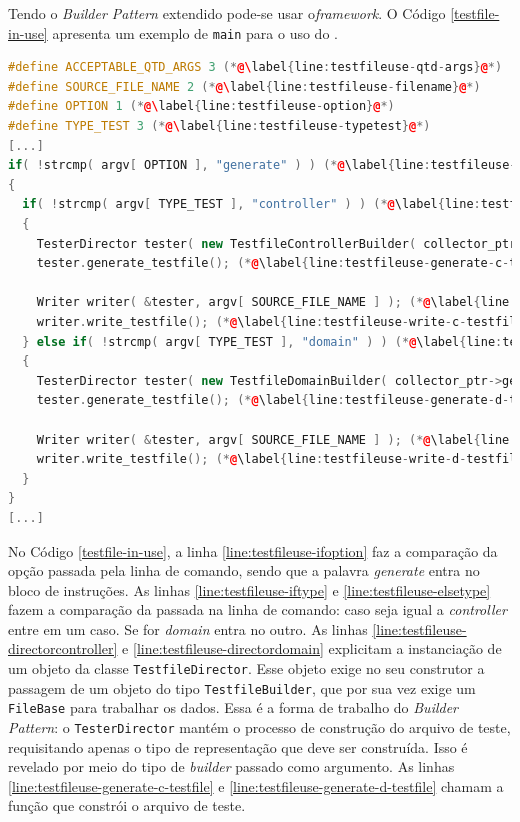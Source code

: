 Tendo o \textit{Builder Pattern} extendido pode-se usar o\textit{framework}.
O Código \ref{testfile-in-use} apresenta um exemplo de \lstinline|main| para
o uso do \Scarefault.

\begin{lstlisting}[language=C++, label=testfile-in-use, caption=Agente testador sendo usado na função \lstinline|main|]
#define ACCEPTABLE_QTD_ARGS 3 (*@\label{line:testfileuse-qtd-args}@*)
#define SOURCE_FILE_NAME 2 (*@\label{line:testfileuse-filename}@*)
#define OPTION 1 (*@\label{line:testfileuse-option}@*)
#define TYPE_TEST 3 (*@\label{line:testfileuse-typetest}@*)
[...]
if( !strcmp( argv[ OPTION ], "generate" ) ) (*@\label{line:testfileuse-ifoption}@*)
{
  if( !strcmp( argv[ TYPE_TEST ], "controller" ) ) (*@\label{line:testfileuse-iftype}@*)
  {
    TesterDirector tester( new TestfileControllerBuilder( collector_ptr->get_data() ) ); (*@\label{line:testfileuse-directorcontroller}@*)
    tester.generate_testfile(); (*@\label{line:testfileuse-generate-c-testfile}@*)

    Writer writer( &tester, argv[ SOURCE_FILE_NAME ] ); (*@\label{line:testfileuse-writer-c}@*)
    writer.write_testfile(); (*@\label{line:testfileuse-write-c-testfile}@*)
  } else if( !strcmp( argv[ TYPE_TEST ], "domain" ) ) (*@\label{line:testfileuse-elsetype}@*)
  {
    TesterDirector tester( new TestfileDomainBuilder( collector_ptr->get_data() ) ); (*@\label{line:testfileuse-directordomain}@*)
    tester.generate_testfile(); (*@\label{line:testfileuse-generate-d-testfile}@*)

    Writer writer( &tester, argv[ SOURCE_FILE_NAME ] ); (*@\label{line:testfileuse-writer-d}@*)
    writer.write_testfile(); (*@\label{line:testfileuse-write-d-testfile}@*)
  }
}
[...]
\end{lstlisting}

No Código \ref{testfile-in-use}, a linha \ref{line:testfileuse-ifoption}
faz a comparação da opção passada pela linha de comando, sendo que a palavra
\textit{generate} entra no bloco de instruções. As linhas
\ref{line:testfileuse-iftype} e \ref{line:testfileuse-elsetype} fazem a
comparação da \str passada na linha de comando: caso seja igual a
\textit{controller} entre em um caso. Se for \textit{domain} entra no
outro. As linhas \ref{line:testfileuse-directorcontroller} e
\ref{line:testfileuse-directordomain} explicitam a instanciação de um
objeto da classe \lstinline|TestfileDirector|. Esse objeto exige no
seu construtor a passagem de um objeto do tipo \lstinline|TestfileBuilder|,
que por sua vez exige um \lstinline|FileBase| para trabalhar os dados. Essa
é a forma de trabalho do \textit{Builder Pattern}: o \lstinline|TesterDirector|
mantém o processo de construção do arquivo de teste, requisitando apenas o
tipo de representação que deve ser construída. Isso é revelado por meio do
tipo de \textit{builder} passado como argumento. As linhas
\ref{line:testfileuse-generate-c-testfile} e \ref{line:testfileuse-generate-d-testfile}
chamam a função que constrói o arquivo de teste.


